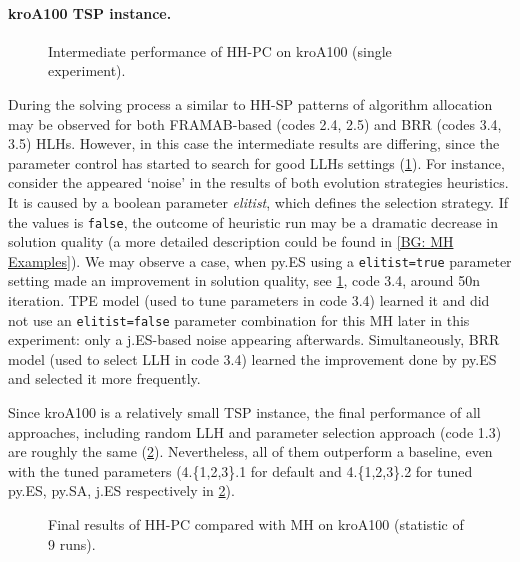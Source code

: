 \newpage
\paragraph{kroA100 TSP instance.}
\begin{figure}[t]
	\centering
	\vspace{-20pt}
	
	\caption{Intermediate performance of HH-PC on kroA100 (single experiment).}
	\vspace{-10pt}
	\label{eval:pict:hh-pc:kroA100 intermediate}
\end{figure}
During the solving process a similar to HH-SP patterns of algorithm allocation may be observed for both FRAMAB-based (codes 2.4, 2.5) and BRR (codes 3.4, 3.5) HLHs. However, in this case the intermediate results are differing, since the parameter control has started to search for good LLHs settings (\cref{eval:pict:hh-pc:kroA100 intermediate}). For instance, consider the appeared `noise' in the results of both evolution strategies heuristics. It is caused by a boolean parameter \emph{elitist}, which defines the selection strategy. If the values is \texttt{false}, the outcome of heuristic run may be a dramatic decrease in solution quality (a more detailed description could be found in \cref{BG: MH Examples}). We may observe a case, when py.ES using a \texttt{elitist=true} parameter setting made an improvement in solution quality, see \cref{eval:pict:hh-pc:kroA100 intermediate}, code 3.4, around 50n iteration. TPE model (used to tune parameters in code 3.4) learned it and did not use an \texttt{elitist=false} parameter combination for this MH later in this experiment: only a j.ES-based noise appearing afterwards. Simultaneously, BRR model (used to select LLH in code 3.4) learned the improvement done by py.ES and selected it more frequently.

Since kroA100 is a relatively small TSP instance, the final performance of all approaches, including random LLH and parameter selection approach (code 1.3) are roughly the same (\cref{eval:pict:hh-pc:kroA100 final}). Nevertheless, all of them outperform a baseline, even with the tuned parameters (4.\{1,2,3\}.1 for default and 4.\{1,2,3\}.2 for tuned py.ES, py.SA, j.ES respectively in \cref{eval:pict:hh-pc:kroA100 final}).

\begin{figure}[b]
	\centering
	\vspace{-20pt}
	
	\caption{Final results of HH-PC compared with MH on kroA100 (statistic of 9 runs).}
	\vspace{-5pt}
	\label{eval:pict:hh-pc:kroA100 final}
\end{figure}

